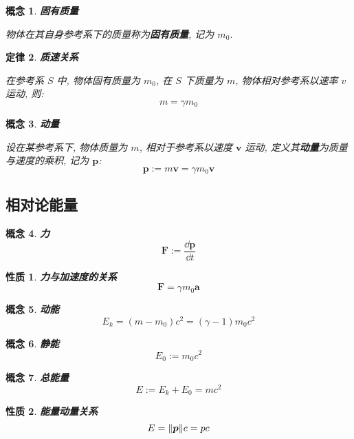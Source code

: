 \documentclass[UTF8]{ctexart}
\newcommand{\<}{\langle}
\renewcommand{\>}{\rangle}                              %
\newenvironment{dfn_box}{
    \begin{tcolorbox}[enhanced, colback=dfn_green2, boxrule=0pt, frame hidden,
        borderline west={0.7mm}{0.1mm}{dfn_green1},breakable]
    }
    {\end{tcolorbox}}
\newenvironment{axm_box}{
    \begin{tcolorbox}[enhanced, colback=axm_yellow2, boxrule=0pt, frame hidden,
        borderline west={0.7mm}{0.1mm}{axm_yellow1},breakable]
    }
    {\end{tcolorbox}}
\newenvironment{ppt_box}{
    \begin{tcolorbox}[enhanced, colback=ppt_pink2, boxrule=0pt, frame hidden,
        borderline west={0.7mm}{0.1mm}{ppt_pink1},breakable]
    }
    {\end{tcolorbox}}
\theoremstyle{MyStyle} %
\newtheorem{definition}{概念}[subsection]
\newenvironment{cpt}{\begin{dfn_box}\begin{definition}}{\end{definition}\end{dfn_box}}
\newtheorem{axm}[definition]{定律}
\newenvironment{thr}{\begin{axm_box}\begin{axm}}{\end{axm}\end{axm_box}}
\newtheorem{property}{性质}[definition]
\newenvironment{ppt}{\begin{ppt_box}\begin{property}}{\end{property}\end{ppt_box}}
\begin{document}
        \begin{cpt}
            \textbf{固有质量}

            物体在其自身参考系下的质量称为\textbf{固有质量}, 记为 \(m_0\). 
        \end{cpt}
        
        \begin{thr}
            \textbf{质速关系}

            在参考系 \(S\) 中, 物体固有质量为 \(m_0\), 在 \(S\) 下质量为 \(m\), 物体相对参考系以速率 \(v\) 运动, 则: 
            \[m = \gamma m_0\]
        \end{thr}

        \begin{cpt}
            \textbf{动量}

            设在某参考系下, 物体质量为 \(m\), 相对于参考系以速度 \(\bm{v}\) 运动, 定义其\textbf{动量}为质量与速度的乘积, 记为 \(\bm{p}\): 
            \[\bm{p} := m\bm{v}=\gamma m_0\bm{v}\]
        \end{cpt}

    \subsection{相对论能量}
        
        \begin{cpt}
            \textbf{力}
            \[\bm{F}:=\frac{\dd\bm{p}}{\dd t}\]
        \end{cpt}
        
        \begin{ppt}
            \textbf{力与加速度的关系}
            \[\bm{F} = \gamma m_0\bm{a}\]
        \end{ppt}
        
        \begin{cpt}
            \textbf{动能}
            \[E_k=(m-m_0)c^2=(\gamma-1)m_0 c^2\]
        \end{cpt}
        
        \begin{cpt}
            \textbf{静能}
            \[E_0:=m_0 c^2\]
        \end{cpt}
        
        \begin{cpt}
            \textbf{总能量}
            \[E := E_k + E_0 = mc^2\]
        \end{cpt}
        
        \begin{ppt}
            \textbf{能量动量关系}
            \[E=\norm{\bm{p}}c=pc\]
        \end{ppt}
    
\end{document}
